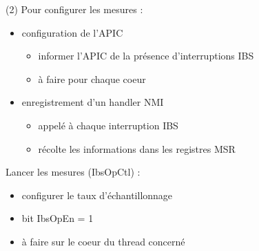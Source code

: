      \begin{frame}{\secname}{\subsecname (2)}        
	Pour configurer les mesures :
	\begin{itemize}
          \item configuration de l'APIC
          \begin{itemize}
            \item informer l'APIC de la présence d'interruptions IBS
            \item à faire pour chaque coeur
          \end{itemize}
          \item enregistrement d'un handler NMI
          \begin{itemize}
            \item appelé à chaque interruption IBS
            \item récolte les informations dans les registres MSR
          \end{itemize}
        \end{itemize}
	\vspace{0.4cm}
        Lancer les mesures (IbsOpCtl) : 
	\begin{itemize}
	  \item configurer le taux d'échantillonnage
	  \item bit IbsOpEn = 1
	  \item à faire sur le coeur du thread concerné
	\end{itemize}
      \end{frame}
